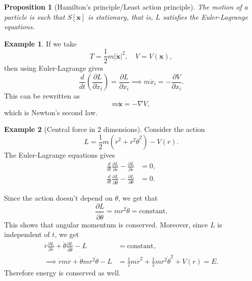 \documentclass[12pt]{article}
\newtheorem{proposition}{Proposition}[section]
\theoremstyle{definition}
\newtheorem{example}{Example}[section]
\theoremstyle{remark}
\begin{document}
\begin{proposition}[Hamilton's principle/Least action principle]
	The motion of a particle is such that $S[\mathbf{x}]$ is stationary, that is, $L$ satisfies the Euler-Lagrange equations.
\end{proposition}

\begin{adjustbox}{minipage = \columnwidth - 25.5pt, margin=1em, frame=1pt, margin=0em}
\begin{example}
	If we take
	\[
		T = \frac{1}{2} m |\mathbf{\dot x}|^2, \quad V = V(\mathbf{x})
	,\]
	then using Euler-Lagrange gives
	\[
		\frac{d}{dt} \left( \frac{\partial L}{\partial \dot x_i} \right) = \frac{\partial L}{\partial x_i} \implies m \ddot x_i = - \frac{\partial V}{\partial x_i}
	.\]
	This can be rewritten as
	\[
	m \mathbf{\ddot x} = - \nabla V
	,\]
	which is Newton's second law.
\end{example}

\end{adjustbox}

\begin{adjustbox}{minipage = \columnwidth - 25.5pt, margin=1em, frame=1pt, margin=0em}
	\begin{example}[Central force in 2 dimensions]
	Consider the action
	\[
		L = \frac{1}{2} m (\dot r^2 + r^2 \dot \theta ^2) - V(r)
	.\]
	The Euler-Lagrange equations gives
	\begin{align*}
		\frac{d}{dt} \frac{\partial L}{\partial \dot r} - \frac{\partial L}{\partial r} &= 0, \\
		\frac{d}{dt} \frac{\partial L}{\partial \dot \theta} - \frac{\partial L}{\partial \theta} &= 0.
	\end{align*}

\end{example}

\end{adjustbox}

\begin{adjustbox}{minipage = \columnwidth - 25.5pt, margin=1em, frame=1pt, margin=0em}
	Since the action doesn't depend on $\theta$, we get that
	\[
		\frac{\partial L}{\partial \dot \theta} = mr^2 \dot \theta = \text{constant}
	.\]
	This shows that angular momentum is conserved. Moreover, since $L$ is independent of $t$, we get
	\begin{align*}
		\dot r \frac{\partial L}{\partial \dot r} + \dot \theta \frac{\partial L}{\partial \dot \theta} - L &= \text{constant}, \\
		\implies \dot r m \dot r + \dot \theta m r^2 \dot \theta - L &= \frac{1}{2} m \dot r^2 + \frac{1}{2} m r^2 \dot \theta^2 + V(r) = E.
	\end{align*}
	Therefore energy is conserved as well.

\end{adjustbox}
\end{document}

